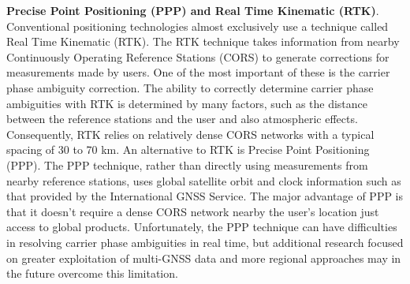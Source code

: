 \textbf{Precise Point Positioning (PPP) and Real Time Kinematic (RTK)}. Conventional positioning technologies almost exclusively use a technique called Real Time Kinematic (RTK). The RTK technique takes information from nearby Continuously Operating Reference Stations (CORS) to generate corrections for measurements made by users. One of the most important of these is the carrier phase ambiguity correction. The ability to correctly determine carrier phase ambiguities with RTK is determined by many factors, such as the distance between the reference stations and the user and also atmospheric effects. Consequently, RTK relies on relatively dense CORS networks with a typical spacing of 30 to 70 km. An alternative to RTK is Precise Point Positioning (PPP). The PPP technique, rather than directly using measurements from nearby reference stations, uses global satellite orbit and clock information such as that provided by the International GNSS Service. The major advantage of PPP is that it doesn’t require a dense CORS network nearby the user’s location just access to global products. Unfortunately, the PPP technique can have difficulties in resolving carrier phase ambiguities in real time, but additional research focused on greater exploitation of multi-GNSS data and more regional approaches may in the future overcome this limitation.